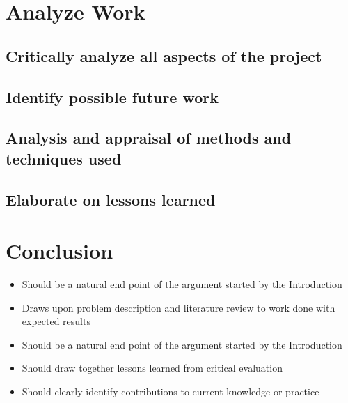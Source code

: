 \documentclass{report}
\begin{document}
\chapter{Analyze Work}
\section{Critically analyze all aspects of the project}
\section{Identify possible future work}
\section{Analysis and appraisal of methods and techniques used}
\section{Elaborate on lessons learned}

\chapter{Conclusion}
\begin{itemize}
  \item Should be a natural end point of the argument started by the Introduction
  \item Draws upon problem description and literature review to work done with
    expected results
  \item Should be a natural end point of the argument started by the Introduction
  \item Should draw together lessons learned from critical evaluation
  \item Should clearly identify contributions to current knowledge or practice
\end{itemize}
\end{document}
